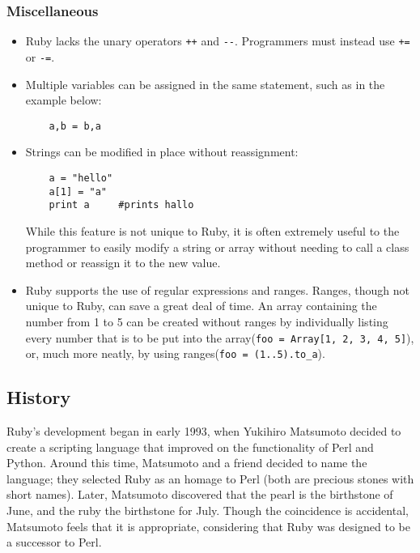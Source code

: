 \documentclass[12pt]{article}
\begin{document}
\subsubsection{Miscellaneous}
\begin{itemize}
    \item {Ruby lacks the unary operators \verb|++| and \verb|--|. Programmers must instead use \verb|+=| or \verb|-=|\cite{rubymisc}.}
    \item {Multiple variables can be assigned in the same statement, such as in the example below:
    \begin{lstlisting} 
    a,b = b,a
    \end{lstlisting}}
    \item{Strings can be modified in place without reassignment: 
    \begin{lstlisting}
    a = "hello"
    a[1] = "a"
    print a     #prints hallo
    \end{lstlisting}
    While this feature is not unique to Ruby, it is often extremely useful to the programmer to easily modify a string or array without needing to call a class method or reassign it to the new value.}
    \item{Ruby supports the use of regular expressions and ranges. Ranges, though not unique to Ruby, can save a great deal of time. An array containing the number from 1 to 5 can be created without ranges by individually listing every number that is to be put into the array(\verb|foo = Array[1, 2, 3, 4, 5]|), or, much more neatly, by using ranges(\verb|foo = (1..5).to_a|)\cite{rangetut}.}
    
\end{itemize}





\subsection{History}
Ruby's development began in early 1993, when Yukihiro Matsumoto decided to create a scripting language that improved on the functionality of Perl and Python\cite{rubyinterview}. 
Around this time, Matsumoto and a friend decided to name the language; they selected Ruby as an homage to Perl (both are precious stones with short names)\cite{rubyinterview}. Later, Matsumoto discovered that the pearl is the birthstone of June, and the ruby the birthstone for July. Though the coincidence is accidental, Matsumoto feels that it is appropriate, considering that Ruby was designed to be a successor to Perl.
\end{document}
